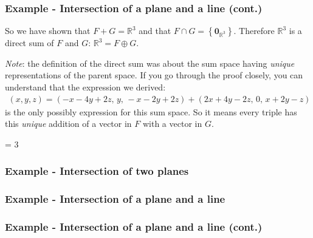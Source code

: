 \documentclass[usenames,dvipsnames,aspectratio=169,10pt]{beamer}
\def \EXAMPLEVERSION {1} %
\numberwithin{equation}{section}
\begin{document}
\begin{frame}
\frametitle{Example - Intersection of a plane and a line (cont.)}
So we have shown that $F+G=\mathbb{R}^3$ and that $F \cap G  = \left\{ \textbf{0}_{\mathbb{R}^3} \right\}$. Therefore $\mathbb{R}^3$ is a direct sum of $F$ and $G$: $\mathbb{R}^3=F \oplus G$.

\textit{Note}: the definition of the direct sum was about the sum space having \textit{unique} representations of the parent space. If you go through the proof closely, you can understand that the expression we derived:
\begin{align*}
(x,y,z) = (-x-4y + 2z, \, y, \, -x-2y + 2z ) + (2x+4y-2z, \, 0, \, x+2y-z)
\end{align*}
is the only possibly expression for this sum space. So it means every triple has this \textit{unique} addition of a vector in $F$ with a vector in $G$.
\end{frame}
\fi




\ifnum \EXAMPLEVERSION = 3
\begin{frame}
\frametitle{Example - Intersection of two planes}
\end{frame}


\begin{frame}
\frametitle{Example - Intersection of a plane and a line}
\end{frame}


\begin{frame}
\frametitle{Example - Intersection of a plane and a line (cont.)}
\end{frame}
\fi
\end{document}
